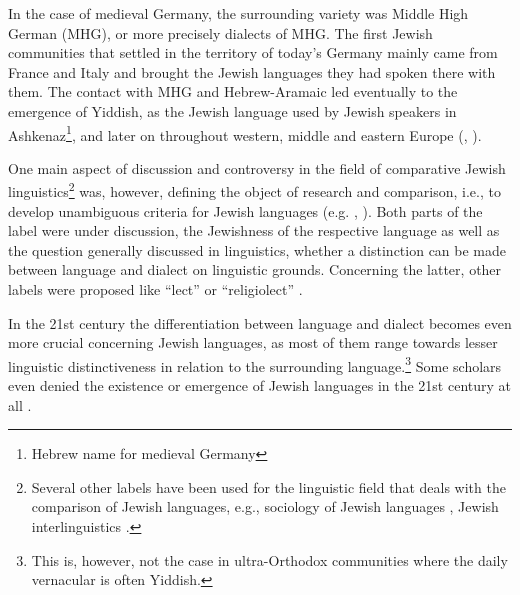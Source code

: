 \documentclass[output=paper]{langscibook}
\begin{document}
In the case of medieval Germany, the surrounding variety was Middle High German (MHG), or more precisely dialects of MHG. The first Jewish communities that settled in the territory of today's Germany mainly came from France and Italy and brought the Jewish languages they had spoken there with them. The contact with MHG and Hebrew-Aramaic led eventually to the emergence of Yiddish, as the Jewish language used by Jewish speakers in Ashkenaz\footnote{Hebrew name for medieval Germany}, and later on throughout western, middle and eastern Europe (\citealt{Weinreich2008}, \citealt{Jacobs2005}).

One main aspect of discussion and controversy in the field of comparative Jewish linguistics\footnote{Several other labels have been used for the linguistic field that deals with the comparison of Jewish languages, e.g., sociology of Jewish languages \citep{Fishman1981}, Jewish interlinguistics \citep{Wexler1981}.} was, however, defining the object of research and comparison, i.e., to develop unambiguous criteria for Jewish languages (e.g. \citealt{Rabin1981}, \citealt{Fishman1981}). Both parts of the label were under discussion, the Jewishness of the respective language as well as the question generally discussed in linguistics, whether a distinction can be made between language and dialect on linguistic grounds. Concerning the latter, other labels were proposed like “lect” \citep{Gold1981} or “religiolect” \citep{HaryWein2013}.

In the 21st century the differentiation between language and dialect becomes even more crucial concerning Jewish languages, as most of them range towards lesser linguistic distinctiveness in relation to the surrounding language.\footnote{This is, however, not the case in ultra-Orthodox communities where the daily vernacular is often Yiddish.} Some scholars even denied the existence or emergence of Jewish languages in the 21st century at all \citep{Myhill2004}.
\end{document}
